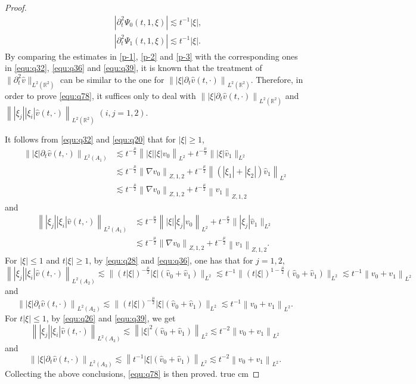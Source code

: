 \documentclass[10pt,a4paper]{amsart}
\newcommand{\R}{\mathbb R}
\newcommand{\f}{\frac}
\newcommand{\p}{\partial}
\begin{document}
\begin{proof}
\begin{equation}
\begin{aligned}
& \left|\p_t^2\Psi_0(t, 1,\xi)\right| \lesssim t^{-1}|\xi|, \\
& \left|\p_t^2\Psi_1(t, 1, \xi)\right|  \lesssim t^{-1}|\xi|.
\end{aligned}
\end{equation}
By comparing the estimates in \eqref{p-1}, \eqref{p-2} and \eqref{p-3} with the corresponding ones in \eqref{equ:q32}, \eqref{equ:q36} and \eqref{equ:q39},
it is known that the treatment of $\|\p_t^2\hat{v}\|_{L^2(\R^2)}$ can be similar to the one for $\left\||\xi|\p_t\hat{v}(t, \cdot)\right\|_{L^2(\R^2)}$. Therefore, in order to prove  \eqref{equ:q78}, it suffices only to deal with $\left\||\xi|\p_t\hat{v}(t, \cdot)\right\|_{L^2(\R^2)}$ and $\left\||\xi_j||\xi_i|\hat{v}(t, \cdot)\right\|_{L^2(\R^2)}$ $(i, j=1, 2)$.

It follows from  \eqref{equ:q32} and \eqref{equ:q20} that for $|\xi|\geq 1$,
$$
\begin{aligned}
\left\||\xi|\p_t\hat{v}(t, \cdot)\right\|_{L^2(A_1)}
& \lesssim t^{-\frac{\mu}{2}}\left\||\xi||\xi|\hat{v_{0}}\right\|_{L^{2}}+t^{-\f{\mu}{2}} \||\xi|\hat{v}_{1}\|_{L^{2}}\\
& \lesssim t^{-\frac{\mu}{2}}\left\|\nabla v_{0}\right\|_{Z, 1, 2}+t^{-\f{\mu}{2}}\left\|(|\xi_1|+|\xi_2|)\hat{v}_1\right\|_{L^2}\\
& \lesssim t^{-\f{\mu}{2}}\left\|\nabla v_0\right\|_{Z, 1, 2}+t^{-\f{\mu}{2}}\left\|v_1\right\|_{Z, 1,2}
\end{aligned}
$$
and
$$
\begin{aligned}
\left\||\xi_j||\xi_i|\hat{v}(t, \cdot)\right\|_{L^2(A_1)}
& \lesssim t^{-\frac{\mu}{2}}\left\||\xi||\xi_j|v_{0}\right\|_{L^{2}}+t^{-\f{\mu}{2}} \||\xi_j|\hat{v}_{1}\|_{L^{2}}\\
& \lesssim t^{-\f{\mu}{2}}\left\|\nabla v_0\right\|_{Z, 1, 2}+t^{-\f{\mu}{2}}\left\|v_1\right\|_{Z,1,2}.
\end{aligned}
$$
For $|\xi|\leq1$ and $t|\xi|\geq1$, by \eqref{equ:q28} and \eqref{equ:q36}, one has that for $j=1, 2$,
$$
\left\||\xi_j||\xi_i|\hat{v}(t, \cdot)\right\|_{L^2(A_2)}\lesssim \big\|(t|\xi|)^{-\f{\mu}{2}}|\xi|(\hat{v}_{0}+\hat{v}_{1})\big\|_{L^{2}}
\lesssim t^{-1} \big\|(t|\xi|)^{1-\f{\mu}{2}}(\hat{v}_{0}+\hat{v}_{1})\big\|_{L^{2}} \lesssim t^{-1}\left\|v_0+v_1\right\|_{L^ 2}
$$
and
$$
\left\||\xi|\p_t\hat{v}(t, \cdot)\right\|_{L^2(A_2)}\lesssim \big\|(t|\xi|)^{-\f{\mu}{2}}|\xi|(\hat{v}_{0}+\hat{v}_{1})\big\|_{L^{2}} \lesssim t^{-1}\left\|v_0+v_1\right\|_{L^ 2}.
$$
For $t|\xi|\leq1$, by \eqref{equ:q26} and \eqref{equ:q39}, we get
$$
\left\||\xi_j||\xi_i|\hat{v}(t, \cdot)\right\|_{L^2(A_3)}\lesssim \left\||\xi|^2(\hat{v}_{0}+\hat{v}_{1})\right\|_{L^{2}} \lesssim t^{-2}\left\|v_0+v_1\right\|_{L^ 2}
$$
and
$$
\left\||\xi|\p_t\hat{v}(t, \cdot)\right\|_{L^2(A_3)}\lesssim \left\|t^{-1}|\xi|(\hat{v}_{0}+\hat{v}_{1})\right\|_{L^{2}} \lesssim t^{-2}\left\|v_0+v_1\right\|_{L^ 2}.
$$
Collecting the above conclusions, \eqref{equ:q78} is then proved.
 true cm


\end{proof}
\end{document}
